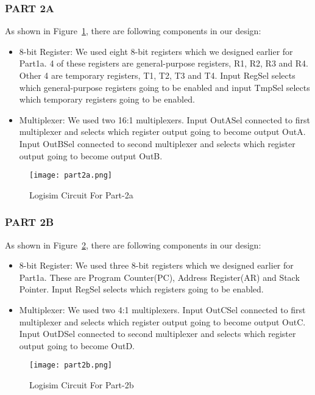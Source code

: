 \documentclass[pdftex,12pt,a4paper]{article}
\begin{document}
\subsubsection{PART 2A}
As shown in Figure~\ref{fig3}, there are following components in our design:
\begin{itemize}
\item 8-bit Register: We used eight 8-bit registers which we designed earlier for Part1a. 4 of these registers are general-purpose registers, R1, R2, R3 and R4. Other 4 are temporary registers, T1, T2, T3 and T4. Input RegSel selects which general-purpose registers going to be enabled and input TmpSel selects which temporary registers going to be enabled.
\item Multiplexer: We used two 16:1 multiplexers. Input OutASel connected to first multiplexer and selects which register output going to become output OutA. Input OutBSel connected to second multiplexer and selects which register output going to become output OutB.
\end{itemize}

\begin{figure}[H]
	\centering
	\texttt{[image: part2a.png]}	
	\caption{Logisim Circuit For Part-2a}
	\label{fig3}
\end{figure}

\subsubsection{PART 2B}
As shown in Figure~\ref{fig4}, there are following components in our design:
\begin{itemize}
\item 8-bit Register: We used three 8-bit registers which we designed earlier for Part1a. These are Program Counter(PC), Address Register(AR) and Stack Pointer. Input RegSel selects which registers going to be enabled. 
\item Multiplexer: We used two 4:1 multiplexers. Input OutCSel connected to first multiplexer and selects which register output going to become output OutC. Input OutDSel connected to second multiplexer and selects which register output going to become OutD.
\end{itemize}

\begin{figure}[H]
	\centering
	\texttt{[image: part2b.png]}	
	\caption{Logisim Circuit For Part-2b}
	\label{fig4}
\end{figure}
\end{document}
